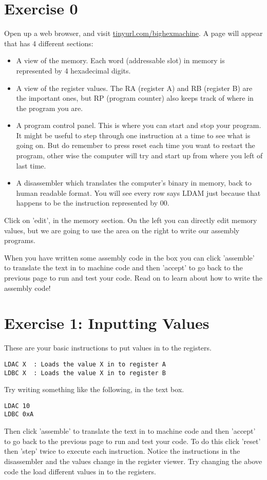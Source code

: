 \documentclass[10pt,a4paper]{article}
\begin{document}
\section{Exercise 0}
Open up a web browser, and visit \href{http://tinyurl.com/bighexmachine}{tinyurl.com/bighexmachine}. A page will appear  that has 4 different sections:
\begin{itemize}
\item A view of the memory. Each word (addressable slot) in memory is represented by  4 hexadecimal digits.
\item A view of the register values. The RA (register A) and RB (register B) are the important ones, but RP (program counter) also keeps track of where in the program you are.
\item A program control panel. This is where you can start and stop your program. It might be useful to step through one instruction at a time to see what is going on. But do remember to press reset each time you want to restart the program, other wise the computer will try and start up from where you left of last time.
\item A disassembler which translates the computer's binary in memory, back to human readable format. You will see every row says LDAM just because that happens to be the instruction represented by 00. 
\end{itemize}

Click on 'edit', in the memory section.
On the left you can directly edit memory values, but we are going to use the area on the right to write our assembly programs.

When you have written some assembly code in the box you can click 'assemble' to translate the text in to machine code and then 'accept' to go back to the previous page to run and test your code. Read on to learn about how to write the assembly code!

\section{Exercise 1: Inputting Values}
These are your basic instructions to put values in to the registers.
\begin{verbatim}
LDAC X	: Loads the value X in to register A
LDBC X	: Loads the value X in to register B
\end{verbatim}

Try writing something like the following, in the text box.
\begin{lstlisting}[frame=single]
LDAC 10
LDBC 0xA
\end{lstlisting}
Then click 'assemble' to translate the text in to machine code and then 'accept' to go back to the previous page to run and test your code. To do this click 'reset' then 'step' twice to execute each instruction. Notice the instructions in the disassembler and the values change in the register viewer. Try changing the above code the load different values in to the registers.
\end{document}
